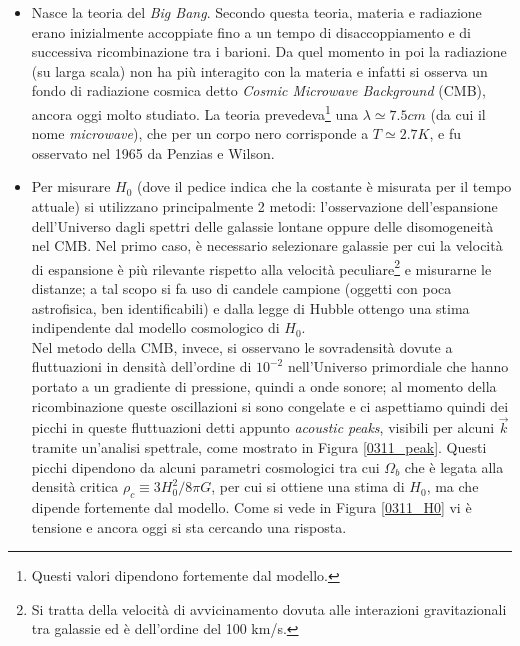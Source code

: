 \begin{itemize}
    \item Nasce la teoria del \textit{Big Bang}. Secondo questa teoria, materia e radiazione erano inizialmente accoppiate fino a un tempo di disaccoppiamento e di successiva ricombinazione tra i barioni. Da quel momento in poi la radiazione (su larga scala) non ha più interagito con la materia e infatti si osserva un fondo di radiazione cosmica detto \textit{Cosmic Microwave Background} (CMB), ancora oggi molto studiato. La teoria prevedeva\footnote{Questi valori dipendono fortemente dal modello.} una $\lambda\simeq 7.5\unit{cm}$ (da cui il nome \textit{microwave}), che per un corpo nero corrisponde a $T\simeq 2.7\unit{K}$, e fu osservato nel 1965 da Penzias e Wilson. 
    \item Per misurare $H_0$ (dove il pedice indica che la costante è misurata per il tempo attuale) si utilizzano principalmente 2 metodi: l'osservazione dell'espansione dell'Universo dagli spettri delle galassie lontane oppure delle disomogeneità nel CMB.
    Nel primo caso, è necessario selezionare galassie per cui la velocità di espansione è più rilevante rispetto alla velocità peculiare\footnote{Si tratta della velocità di avvicinamento dovuta alle interazioni gravitazionali tra galassie ed è dell'ordine del 100 km/s.} e misurarne le distanze; a tal scopo si fa uso di candele campione (oggetti con poca astrofisica, ben identificabili) e dalla legge di Hubble ottengo una stima indipendente dal modello cosmologico di $H_0$.\\ 
    Nel metodo della CMB, invece, si osservano le sovradensità dovute a fluttuazioni in densità dell'ordine di $10^{-2}$ nell'Universo primordiale che hanno portato a un gradiente di pressione, quindi a onde sonore; al momento della ricombinazione queste oscillazioni si sono congelate e ci aspettiamo quindi dei picchi in queste fluttuazioni detti appunto \textit{acoustic peaks}, visibili per alcuni $\Vec{k}$ tramite un'analisi spettrale, come mostrato in Figura \ref{0311_peak}. Questi picchi dipendono da alcuni parametri cosmologici tra cui $\Omega_b$ che è legata alla densità critica $\rho_c\equiv 3H_0^2/8\pi G$, per cui si ottiene una stima di $H_0$, ma che dipende fortemente dal modello. Come si vede in Figura \ref{0311_H0} vi è tensione e ancora oggi si sta cercando una risposta.

\end{itemize}
